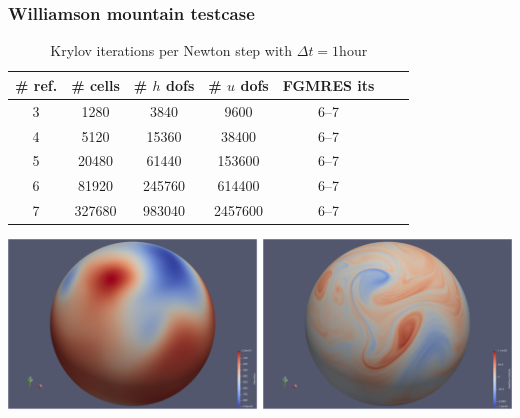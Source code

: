 \documentclass[presentation,aspectratio=43, 10pt]{beamer}
\begin{document}
\begin{frame}
  \frametitle{Williamson mountain testcase}
  \begin{table}[htbp]
    \centering
    \begin{tabular}{cc|ccccc}
      \toprule
      \# ref. & \# cells & \# $h$ dofs & \# $u$ dofs & FGMRES its\\
      \midrule
      3   & 1280 & 3840 & 9600 & 6--7\\
      4 & 5120  & 15360 & 38400 & 6--7\\
      5 & 20480 & 61440 & 153600 & 6--7\\
      6 & 81920 & 245760 & 614400 & 6--7\\
      7 & 327680 & 983040 & 2457600 & 6--7\\
      \bottomrule
    \end{tabular}
    \caption{Krylov iterations per Newton step with
      $\Delta t = 1\text{hour}$}
  \end{table}

  {\centering
    \includegraphics[height=0.4\textheight]{williamson-mountain-al}\par
    }
\end{frame}
\end{document}
